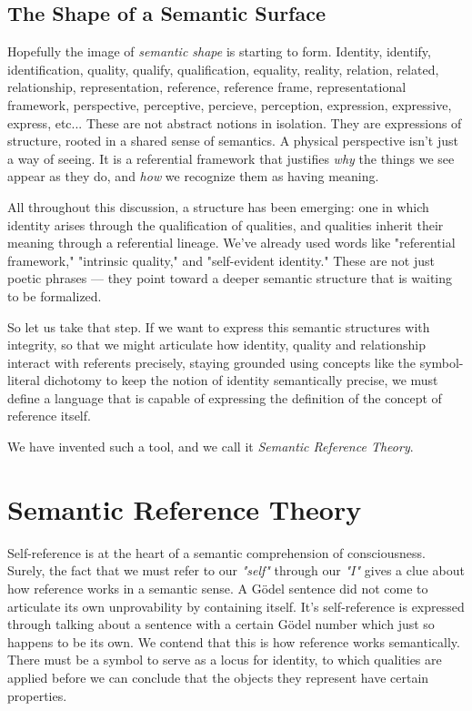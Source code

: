 \documentclass[runningheads]{llncs}
\begin{document}
\subsection{The Shape of a Semantic Surface}

Hopefully the image of \emph{semantic shape} is starting to form. Identity, identify, identification, quality, qualify, qualification, equality, reality, relation, related, relationship, representation, reference, reference frame, representational framework, perspective, perceptive, percieve, perception, expression, expressive, express, etc... These are not abstract notions in isolation. They are expressions of structure, rooted in a shared sense of semantics. A physical perspective isn't just a way of seeing. It is a referential framework that justifies \emph{why} the things we see appear as they do, and \emph{how} we recognize them as having meaning.

All throughout this discussion, a structure has been emerging: one in which identity arises through the qualification of qualities, and qualities inherit their meaning through a referential lineage. We've already used words like "referential framework," "intrinsic quality," and "self-evident identity." These are not just poetic phrases — they point toward a deeper semantic structure that is waiting to be formalized.

So let us take that step. If we want to express this semantic structures with integrity, so that we might articulate how identity, quality and relationship interact with referents precisely, staying grounded using concepts like the symbol-literal dichotomy to keep the notion of identity semantically precise, we must define a language that is capable of expressing the definition of the concept of reference itself.

We have invented such a tool, and we call it \emph{Semantic Reference Theory}.


\section{Semantic Reference Theory}

Self-reference is at the heart of a semantic comprehension of consciousness. Surely, the fact that we must refer to our \emph{"self"} through our \emph{"I"} gives a clue about how reference works in a semantic sense. A Gödel sentence did not come to articulate its own unprovability by containing itself. It's self-reference is expressed through talking about a sentence with a certain Gödel number which just so happens to be its own. We contend that this is how reference works semantically. There must be a symbol to serve as a locus for identity, to which qualities are applied before we can conclude that the objects they represent have certain properties. 
\end{document}
